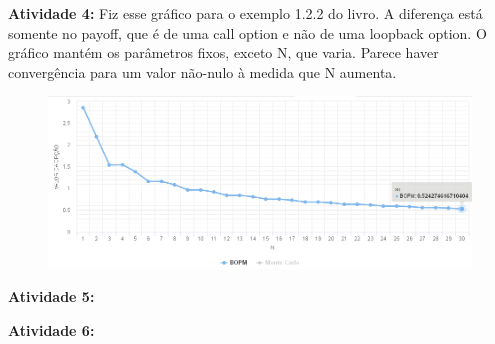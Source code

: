 \documentclass[]{article}
\begin{document}
\textbf{Atividade 4:} Fiz esse gráfico para o exemplo 1.2.2 do livro. A
diferença está somente no payoff, que é de uma call option e não de uma
loopback option. O gráfico mantém os parâmetros fixos, exceto N, que
varia. Parece haver convergência para um valor não-nulo à medida que N
aumenta.

\begin{figure}
\centering
\includegraphics{grafico3.png}
\caption{}
\end{figure}

\textbf{Atividade 5:}

\textbf{Atividade 6:}
\end{document}
